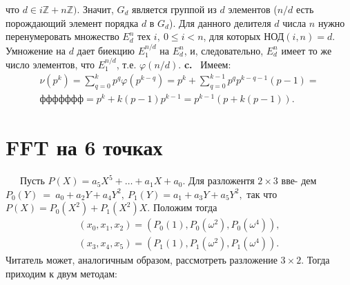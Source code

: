 \documentclass{mai_book}
\begin{document}
\newpage
\fancyhead{}
\fancyhead[RE,LO]{\thepage}%
\fancyhead[RO]{\textit{\thepage}}
\fancyhead[LE]{\textit{\thepage}}
\fancyfoot{}
\renewcommand{\headrulewidth}{0.5pt}
что $d \in i \mathbb{Z}+ n\mathbb{Z})$. Значит, $G_d$ является группой из $d$ элементов ($n/d$ \linebreak
есть порождающий элемент порядка $d$ в $G_d$). Для данного делителя $d$ \linebreak 
числа $n$ нужно перенумеровать множество $E^n_d$ тех $i,~0 \leq i < n$, для \linebreak
которых НОД$(i,n)=d.$ Умножение на $d$ дает биекцию $E^{n/d}_1$ на $E^n_d$, и, \linebreak
следовательно, $E^n_d$ имеет то же число элементов, что $E^{n/d}_1$, т.е. $\varphi(n/d)$. \linebreak  
\indent \textbf{c.} ~Имеем:
\begin{gather}
\nu(p^k)=\sum^k_{q=0}p^q\varphi(p^{k-q})=p^k+\sum^{k-1}_{q=0}p^q p^{k-q-1}(p-1)= {}\nonumber \\
                                      ффффффф =p^k+k(p-1)p^{k-1}=p^{k-1}(p+k(p-1)). {}\nonumber
\end{gather}

\section{F{\footnotesize FT} на 6 точках}
\indent 
~~~Пусть $P(X)=a_5X^5+\ldots+a_1X+a_0.$ Для разложентя $2\times 3 $ вве-\linebreak
дем $P_0(Y)~=~a_0+a_2Y+a_4Y^2,~P_1(Y)=a_1+a_3Y+a_5Y^2,$ так что \linebreak
$P(X)=P_0(X^2)+P_1(X^2)X.$ Положим тогда 
\begin{gather}
(x_0,x_1,x_2)=(P_0(1),P_0(\omega^2),P_0(\omega^4)), {}\nonumber \\
(x_3,x_4,x_5)=(P_1(1),P_1(\omega^2),P_1(\omega^4)). {} \nonumber 
\end{gather}
Читатель может, аналогичным образом, рассмотреть разложение $3\times 2$. \linebreak
Тогда приходим к двум методам:
\end{document}
